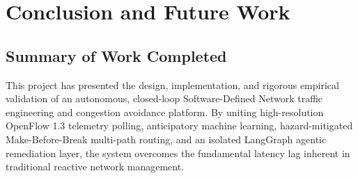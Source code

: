 \chapter{Conclusion and Future Work}
\label{ch:conclusion}

\section{Summary of Work Completed}
This project has presented the design, implementation, and rigorous empirical validation of an autonomous, closed-loop Software-Defined Network traffic engineering and congestion avoidance platform. By uniting high-resolution OpenFlow 1.3 telemetry polling, anticipatory machine learning, hazard-mitigated Make-Before-Break multi-path routing, and an isolated LangGraph agentic remediation layer, the system overcomes the fundamental latency lag inherent in traditional reactive network management.

